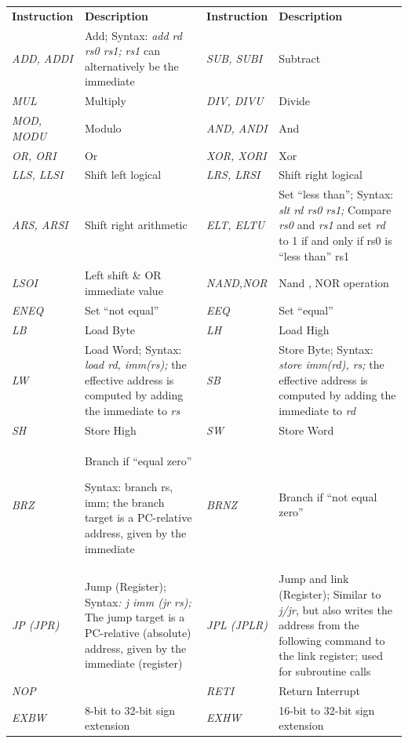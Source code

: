 \documentclass[
]{article}
\begin{document}
\begin{longtable}[]{@{}llll@{}}
\toprule
\endhead
\textbf{Instruction} & \textbf{Description} & \textbf{Instruction} &
\textbf{Description}\tabularnewline
\emph{ADD, ADDI} & Add; Syntax: \emph{add rd rs0 rs1;} \emph{rs1} can
alternatively be the immediate & \emph{SUB, SUBI} &
Subtract\tabularnewline
\emph{MUL} & Multiply & \emph{DIV, DIVU} & Divide\tabularnewline
\emph{MOD, MODU} & Modulo & \emph{AND, ANDI} & And\tabularnewline
\emph{OR, ORI} & Or & \emph{XOR, XORI} & Xor\tabularnewline
\emph{LLS, LLSI} & Shift left logical & \emph{LRS, LRSI} & Shift right
logical\tabularnewline
\emph{ARS, ARSI} & Shift right arithmetic & \emph{ELT, ELTU} & Set
``less than''; Syntax: \emph{slt rd rs0 rs1;} Compare \emph{rs0} and
\emph{rs1} and set \emph{rd} to 1 if and only if rs0 is ``less than''
rs1\tabularnewline
\emph{LSOI} & Left shift \& OR immediate value & \emph{NAND,NOR} & Nand
, NOR operation\tabularnewline
\emph{ENEQ} & Set ``not equal'' & \emph{EEQ} & Set
``equal''\tabularnewline
\emph{LB} & Load Byte & \emph{LH} & Load High\tabularnewline
\emph{LW} & Load Word; Syntax: \emph{load rd, imm(rs);} the effective
address is computed by adding the immediate to \emph{rs} & \emph{SB} &
Store Byte; Syntax: \emph{store imm(rd), rs;} the effective address is
computed by adding the immediate to \emph{rd}\tabularnewline
\emph{SH} & Store High & \emph{SW} & Store Word\tabularnewline
\begin{minipage}[t]{0.22\columnwidth}\raggedright
\emph{BRZ}\strut
\end{minipage} & \begin{minipage}[t]{0.22\columnwidth}\raggedright
Branch if ``equal zero''

Syntax: branch rs, imm; the branch target is a PC-relative address,
given by the immediate\strut
\end{minipage} & \begin{minipage}[t]{0.22\columnwidth}\raggedright
\emph{BRNZ}\strut
\end{minipage} & \begin{minipage}[t]{0.22\columnwidth}\raggedright
Branch if ``not equal zero''\strut
\end{minipage}\tabularnewline
\emph{JP (JPR)} & Jump (Register); Syntax\emph{: j imm (jr rs);} The
jump target is a PC-relative (absolute) address, given by the immediate
(register) & \emph{JPL (JPLR)} & Jump and link (Register); Similar to
\emph{j/jr}, but also writes the address from the following command to
the link register; used for subroutine calls\tabularnewline
\emph{NOP} & & \emph{RETI} & Return Interrupt\tabularnewline
\emph{EXBW} & 8-bit to 32-bit sign extension & \emph{EXHW} & 16-bit to
32-bit sign extension\tabularnewline
\bottomrule
\end{longtable}
\end{document}
